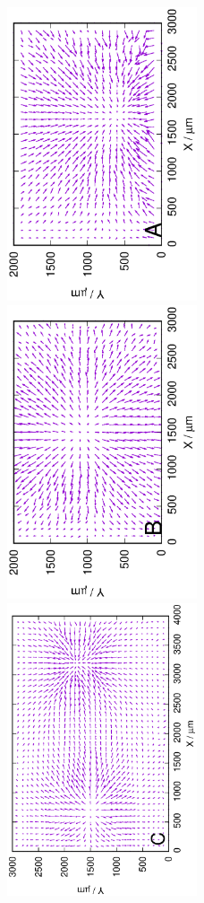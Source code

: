 
\begin{figure}
\centering
\includegraphics[width=0.5\textwidth, angle=-90]{img/mérések/Fe1_h100.eps}
\includegraphics[width=0.5\textwidth, angle=-90]{img/mérések/Zn1_h100.eps}
\includegraphics[width=0.5\textwidth, angle=-90]{img/mérések/grafit1_h100.eps}


\end{figure}
